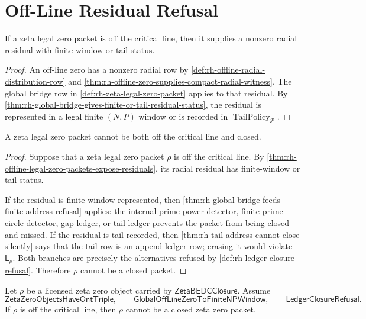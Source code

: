 \section{Off-Line Residual Refusal}
\label{sec:rh-prime-circle-offline-residual-refusal}

\begin{theorem}
\label{thm:rh-offline-legal-zero-packets-expose-residuals}
If a zeta legal zero packet is off the critical line, then it supplies a
nonzero radial residual with finite-window or tail status.
\end{theorem}

\begin{proof}
An off-line zero has a nonzero radial row by
\autoref{def:rh-offline-radial-distribution-row} and
\autoref{thm:rh-offline-zero-supplies-compact-radial-witness}.  The
global bridge row in \autoref{def:rh-zeta-legal-zero-packet} applies to
that residual.  By
\autoref{thm:rh-global-bridge-gives-finite-or-tail-residual-status},
the residual is represented in a legal finite $(N,P)$ window or is
recorded in $\operatorname{TailPolicy}_{\mathcal P}$.
\end{proof}

\begin{theorem}
\label{thm:rh-finite-prime-circle-offline-contradiction}
A zeta legal zero packet cannot be both off the critical line and
closed.
\end{theorem}

\begin{proof}
Suppose that a zeta legal zero packet $\rho$ is off the critical line.
By
\autoref{thm:rh-offline-legal-zero-packets-expose-residuals}, its
radial residual has finite-window or tail status.

If the residual is finite-window represented, then
\autoref{thm:rh-global-bridge-feeds-finite-address-refusal} applies:
the internal prime-power detector, finite prime-circle detector, gap
ledger, or tail ledger prevents the packet from being closed and missed.
If the residual is tail-recorded, then
\autoref{thm:rh-tail-address-cannot-close-silently} says that the tail
row is an append ledger row; erasing it would violate $\mathsf L_\rho$.
Both branches are precisely the alternatives refused by
\autoref{def:rh-ledger-closure-refusal}.  Therefore $\rho$ cannot be a
closed packet.
\end{proof}

\begin{theorem}
\label{thm:rh-offline-licensed-triple-cannot-be-closed}
Let $\rho$ be a licensed zeta zero object carried by
$\mathsf{ZetaBEDCClosure}$.  Assume
$$
\mathsf{ZetaZeroObjectsHaveOntTriple},
\qquad
\mathsf{GlobalOffLineZeroToFiniteNPWindow},
\qquad
\mathsf{LedgerClosureRefusal}.
$$
If $\rho$ is off the critical line, then $\rho$ cannot be a closed zeta
zero packet.
\end{theorem}

